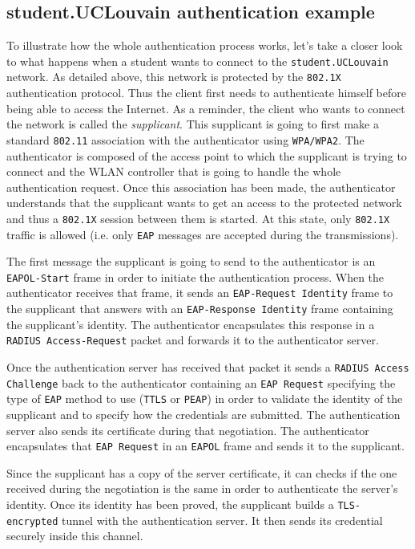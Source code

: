 \subsection{student.UCLouvain authentication example}
To illustrate how the whole authentication process works, let's take a closer look to what happens when a student wants to connect to the \texttt{student.UCLouvain} network.
As detailed above, this network is protected by the \texttt{802.1X} authentication protocol. Thus the client first needs to authenticate himself before being able to access the Internet.
As a reminder, the client who wants to connect the network is called the \textit{supplicant}. This supplicant is going to first make a standard \texttt{802.11} association with the authenticator using \texttt{WPA/WPA2}. The authenticator is composed of the access point to which the supplicant is trying to connect and the WLAN controller that is going to handle the whole authentication request. Once this association has been made, the authenticator understands that the supplicant wants to get an access to the protected network and thus a \texttt{802.1X} session between them is started. At this state, only \texttt{802.1X} traffic is allowed (i.e. only \texttt{EAP} messages are accepted during the transmissions).

The first message the supplicant is going to send to the authenticator is an \texttt{EAPOL-Start} frame in order to initiate the authentication process. When the authenticator receives that frame, it sends an \texttt{EAP-Request Identity} frame to the supplicant that answers with an \texttt{EAP-Response Identity} frame containing the supplicant's identity. The authenticator encapsulates this response in a \texttt{RADIUS Access-Request} packet and forwards it to the authenticator server.

Once the authentication server has received that packet it sends a \texttt{RADIUS Access Challenge} back to the authenticator containing an \texttt{EAP Request} specifying the type of \texttt{EAP} method to use (\texttt{TTLS} or \texttt{PEAP}) in order to validate the identity of the supplicant and to specify how the credentials are submitted. The authentication server also sends its certificate during that negotiation. The authenticator encapsulates that \texttt{EAP Request} in an \texttt{EAPOL} frame and sends it to the supplicant.

Since the supplicant has a copy of the server certificate, it can checks if the one received during the negotiation is the same in order to authenticate the server's identity. Once its identity has been proved, the supplicant builds a \texttt{TLS-encrypted} tunnel with the authentication server. It then sends its credential securely inside this channel.

